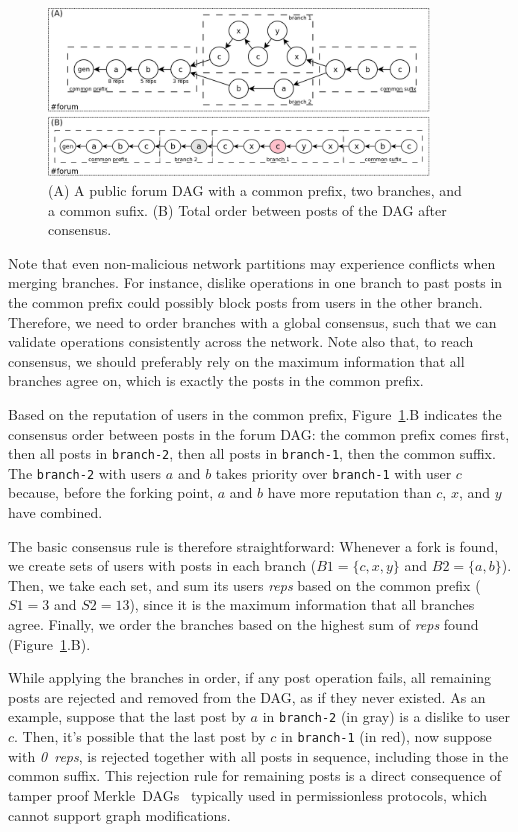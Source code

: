 \documentclass[12pt]{article}
\newcommand{\reps}     {\emph{reps}\xspace}
\newcommand{\nreps}[1] {\emph{#1~reps\xspace}}
\newcommand{\code}[1]  {\texttt{\footnotesize{#1}}}
\begin{document}
\begin{figure}
\centering
\includegraphics[width=0.9\textwidth]{reps.png}
\caption{
    (A) A public forum DAG with a common prefix, two branches, and a common sufix.
    (B) Total order between posts of the DAG after consensus.
}
\label{fig.reps}
\end{figure}

Note that even non-malicious network partitions may experience conflicts when
merging branches.
For instance, dislike operations in one branch to past posts in the common
prefix could possibly block posts from users in the other branch.
Therefore, we need to order branches with a global consensus, such that we can
validate operations consistently across the network.
%
Note also that, to reach consensus, we should preferably rely on the maximum
information that all branches agree on, which is exactly the posts in the
common prefix.

Based on the reputation of users in the common prefix, Figure~\ref{fig.reps}.B
indicates the consensus order between posts in the forum DAG:
    the common prefix comes first,
    then all posts in \code{branch-2},
    then all posts in \code{branch-1},
    then the common suffix.
%
The \code{branch-2} with users $a$ and $b$ takes priority over \code{branch-1}
with user $c$ because, before the forking point, $a$ and $b$ have more
reputation than $c$, $x$, and $y$ have combined.

The basic consensus rule is therefore straightforward:
Whenever a fork is found, we create sets of users with posts in each branch
($B1=\{c,x,y\}$ and $B2=\{a,b\}$).
Then, we take each set, and sum its users \reps based on the common prefix
($S1=3$ and $S2=13$), since it is the maximum information that all branches
agree.
Finally, we order the branches based on the highest sum of \reps found
(Figure~\ref{fig.reps}.B).

While applying the branches in order, if any post operation fails, all
remaining posts are rejected and removed from the DAG, as if they never
existed.
As an example, suppose that the last post by $a$ in \code{branch-2} (in gray)
is a dislike to user $c$.
Then, it's possible that the last post by $c$ in \code{branch-1} (in red), now
suppose with \nreps{0}, is rejected together with all posts in sequence,
including those in the common suffix.
%
This rejection rule for remaining posts is a direct consequence of tamper proof
Merkle~DAGs~\cite{p2p.ipfs,p2p.bitcoin} typically used in permissionless
protocols, which cannot support graph modifications.
\end{document}
